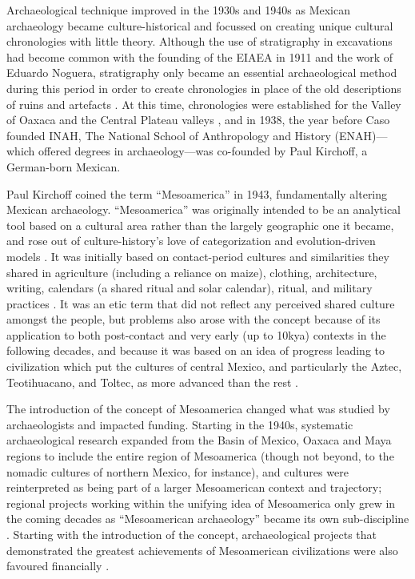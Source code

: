 
Archaeological technique improved in the 1930s and 1940s as Mexican archaeology became culture-historical and focussed on creating unique cultural chronologies with little theory. Although the use of stratigraphy in excavations had become common with the founding of the EIAEA in 1911 and the work of Eduardo Noguera, stratigraphy only became an essential archaeological method during this period in order to create chronologies in place of the old descriptions of ruins and artefacts \parencite[161,172,188]{Bernal1980}. 
At this time, chronologies were established for the Valley of Oaxaca and the Central Plateau valleys \parencite[188]{Bernal1980}, and in 1938, the year before Caso founded INAH, The National School of Anthropology and History (ENAH)—which offered degrees in archaeology—was co-founded by Paul Kirchoff, a German-born Mexican. 

Paul Kirchoff coined the term “Mesoamerica” in 1943, fundamentally altering Mexican archaeology. “Mesoamerica” was originally intended to be an analytical tool based on a cultural area rather than the largely geographic one it became, and rose out of culture-history’s love of categorization and evolution-driven models \parencite[4809,4811]{Runggaldier2001}. 
It was initially based on contact-period cultures and similarities they shared in agriculture (including a reliance on maize), clothing, architecture, writing, calendars (a shared ritual and solar calendar), ritual, and military practices \parencite[4807-4810]{Runggaldier2001}. 
It was an etic term that did not reflect any perceived shared culture amongst the people, but problems also arose with the concept because of its application to both post-contact and very early (up to 10kya) contexts in the following decades, and because it was based on an idea of progress leading to civilization which put the cultures of central Mexico, and particularly the Aztec, Teotihuacano, and Toltec, as more advanced than the rest \parencite[4807-4809,4812]{Runggaldier2001}.

The introduction of the concept of Mesoamerica changed what was studied by archaeologists and impacted funding. Starting in the 1940s, systematic archaeological research expanded from the Basin of Mexico, Oaxaca and Maya regions to include the entire region of Mesoamerica (though not beyond, to the nomadic cultures of northern Mexico, for instance), and cultures were reinterpreted as being part of a larger Mesoamerican context and trajectory; regional projects working within the unifying idea of Mesoamerica only grew in the coming decades as “Mesoamerican archaeology” became its own sub-discipline \parencite[4810]{Runggaldier2001}. 
Starting with the introduction of the concept, archaeological projects that demonstrated the greatest achievements of Mesoamerican civilizations were also favoured financially \parencite[4812]{Runggaldier2001}.

